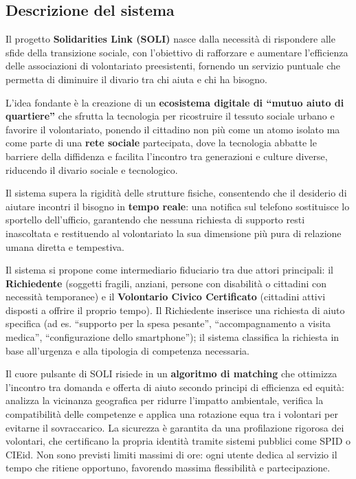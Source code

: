 \documentclass[11pt,a4paper]{article}
\begin{document}
\subsection{Descrizione del sistema}

Il progetto \textbf{Solidarities Link (SOLI)} nasce dalla necessit\`a di rispondere alle sfide della transizione sociale, con l'obiettivo di rafforzare e aumentare l'efficienza delle associazioni di volontariato preesistenti, fornendo un servizio puntuale che permetta di diminuire il divario tra chi aiuta e chi ha bisogno.

L'idea fondante \`e la creazione di un \textbf{ecosistema digitale di ``mutuo aiuto di quartiere''} che sfrutta la tecnologia per ricostruire il tessuto sociale urbano e favorire il volontariato, ponendo il cittadino non pi\`u come un atomo isolato ma come parte di una \textbf{rete sociale} partecipata, dove la tecnologia abbatte le barriere della diffidenza e facilita l'incontro tra generazioni e culture diverse, riducendo il divario sociale e tecnologico.

Il sistema supera la rigidit\`a delle strutture fisiche, consentendo che il desiderio di aiutare incontri il bisogno in \textbf{tempo reale}: una notifica sul telefono sostituisce lo sportello dell'ufficio, garantendo che nessuna richiesta di supporto resti inascoltata e restituendo al volontariato la sua dimensione pi\`u pura di relazione umana diretta e tempestiva.

Il sistema si propone come intermediario fiduciario tra due attori principali: il \textbf{Richiedente} (soggetti fragili, anziani, persone con disabilit\`a o cittadini con necessit\`a temporanee) e il \textbf{Volontario Civico Certificato} (cittadini attivi disposti a offrire il proprio tempo). Il Richiedente inserisce una richiesta di aiuto specifica (ad es. ``supporto per la spesa pesante'', ``accompagnamento a visita medica'', ``configurazione dello smartphone''); il sistema classifica la richiesta in base all'urgenza e alla tipologia di competenza necessaria.

Il cuore pulsante di SOLI risiede in un \textbf{algoritmo di matching} che ottimizza l'incontro tra domanda e offerta di aiuto secondo principi di efficienza ed equit\`a: analizza la vicinanza geografica per ridurre l'impatto ambientale, verifica la compatibilit\`a delle competenze e applica una rotazione equa tra i volontari per evitarne il sovraccarico. La sicurezza \`e garantita da una profilazione rigorosa dei volontari, che certificano la propria identit\`a tramite sistemi pubblici come SPID o CIEid. Non sono previsti limiti massimi di ore: ogni utente dedica al servizio il tempo che ritiene opportuno, favorendo massima flessibilit\`a e partecipazione.
\end{document}
